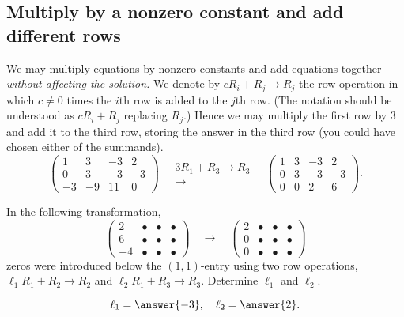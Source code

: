 \documentclass{ximera}
\begin{document}
\subsection{Multiply by a nonzero constant and add different rows}
We may multiply equations by nonzero constants and add equations
together \emph{without affecting the solution.} We denote by
$c R_i + R_j \to R_j$ the row operation in which $c \neq 0$ times the
$i$th row is added to the $j$th row. (The notation should be
understood as $c R_i + R_j$ replacing $R_j$.) Hence we may multiply
the first row by $3$ and add it to the third row, storing the answer
in the third row (you could have chosen either of the summands).
\[
  \left(
    \begin{array}{ccc|c}
      1 &   3 & -3 & 2  \\
      0 &   3 & -3 & -3 \\
      -3& -9  & 11 & 0
    \end{array}
  \right)
  \quad
  \begin{array}{c}
    \scriptstyle 3R_1+R_3\rightarrow R_3\\\longrightarrow
  \end{array}
  \quad
  \left(
    \begin{array}{ccc|c}
      1 &   3 & -3 & 2  \\
      0 &   3 & -3 & -3 \\
      0& 0  & 2 & 6
    \end{array}
  \right).
\]

\begin{question}
  In the following transformation,
  \[
    \begin{pmatrix}
      2 & \bullet & \bullet & \bullet \\
      6 & \bullet & \bullet & \bullet \\
      -4 & \bullet & \bullet & \bullet
    \end{pmatrix}
    \quad\longrightarrow\quad
    \begin{pmatrix}
      2 & \bullet & \bullet & \bullet \\
      0 & \bullet & \bullet & \bullet \\
      0 & \bullet & \bullet & \bullet
    \end{pmatrix}
  \]
  zeros were introduced below the $(1,1)$-entry using two row
  operations, $\ell_1 R_1 + R_2 \to R_2$ and
  $\ell_2 R_1 + R_3 \to R_3$. Determine $\ell_1$ and $\ell_2$.
  \begin{prompt}
    \[
      \ell_1 = \answer{-3}, \quad \ell_2 = \answer{2}.
    \]
  \end{prompt}
\end{question}
\end{document}
